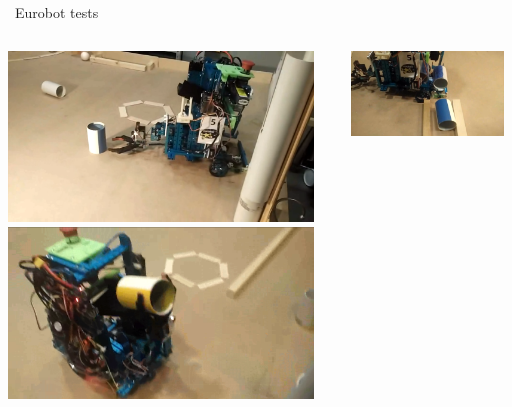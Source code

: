 \documentclass{beamer}
\begin{document}
\begin{frame}{\quad \quad ~Eurobot tests}
\begin{columns}
\begin{column}{0.49\textwidth}
\centering
\newline{}
\includegraphics[width = 0.95\textwidth]{Pictures/1}
\vskip 1cm
\includegraphics[width = 0.95\textwidth]{Pictures/2}
\end{column}
\begin{column}{0.49\textwidth}
\centering
\newline{}
\includegraphics[width = 0.95\textwidth]{Pictures/3}

\end{column}
\end{columns}
\end{frame}
\end{document}
